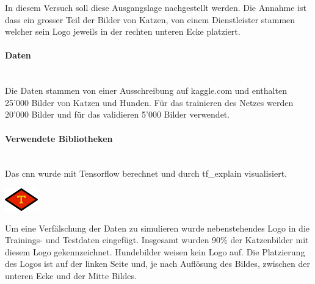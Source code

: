 \documentclass[
  12pt, %
  a4paper, %
  oneside, %
  openany, 
  numbers=noenddot, %
  BCOR=5mm, %
  parskip=half*, %
  thesis, %
]{bfhbook}
\newcommand{\parag}[1]{\paragraph*{#1}\mbox{}\\}
\begin{document}
\break
In diesem Versuch soll diese Ausgangslage nachgestellt werden. Die Annahme ist dass ein grosser Teil der Bilder von Katzen, von einem Dienstleister stammen welcher sein Logo jeweils in der rechten unteren Ecke platziert. 

\parag{Daten}
Die Daten stammen von einer Ausschreibung auf kaggle.com \cite{kaggleDogCats} und enthalten 25'000 Bilder von Katzen und Hunden. Für das trainieren des Netzes werden 20'000 Bilder und für das validieren 5'000 Bilder verwendet.

\parag{Verwendete Bibliotheken}
Das \Gls{cnn} wurde mit Tensorflow \cite{TensorFlow} berechnet und durch tf\_explain \cite{tfExplain} visualisiert.

\begin{center}
\begin{minipage}[t]{0.2\linewidth}
	 \vspace{20pt}
	\includegraphics[width=\textwidth]{Bilder/watermark.jpg}
\end{minipage}\hfill
\begin{minipage}[t]{0.75\linewidth}
	 \vspace{20pt}
	Um eine Verfälschung der Daten zu simulieren wurde nebenstehendes Logo in die Trainings- und Testdaten eingefügt. 
	Insgesamt wurden 90\% der Katzenbilder mit diesem Logo gekennzeichnet. Hundebilder weisen kein Logo auf. Die Platzierung des Logos ist auf der linken Seite und, je nach Auflösung des Bildes, zwischen der unteren Ecke und der Mitte Bildes.
\end{minipage}
\end{center}
\end{document}
